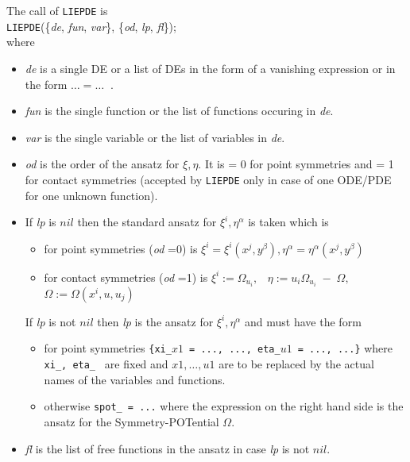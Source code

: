 The call of {\tt LIEPDE} is \\
{\tt LIEPDE}(\{{\it  de}, {\it  fun}, {\it  var}\},
\{{\it  od}, {\it  lp}, {\it  fl}\}); \\
where
\begin{itemize}
\item {\it de} is a single DE or a list of DEs in the form of a vanishing
      expression or in the form $\ldots=\ldots\;\;$.
\item {\it fun} is the single function or the list of functions occuring
      in {\it de}.
\item {\it var} is the single variable or the list of variables in {\it de}.
\item {\it od} is the order of the ansatz for $\xi, \eta.$ It is = 0 for
point symmetries and = 1 for contact symmetries (accepted by
{\tt LIEPDE} only in case of one ODE/PDE for one unknown function).
\item If {\it lp} is $nil$ then the standard ansatz for $\xi^i, \eta^\alpha$
is taken which is
  \begin{itemize}
  \item for point symmetries ({\it od} =0) is $\xi^i = \xi^i(x^j,y^\beta),
      \eta^\alpha = \eta^\alpha(x^j,y^\beta)$
  \item for contact symmetries ({\it od} =1) is
   $ \xi^i := \Omega_{u_i}, \;\;\;
     \eta := u_i\Omega_{u_i} \; - \; \Omega, $ \\
     $\Omega:=\Omega(x^i, u, u_j)$
  \end{itemize}

  If {\it lp} is not $nil$ then {\it lp} is the ansatz for
  $\xi^i, \eta^\alpha$ and must have the form
  \begin{itemize}
    \item for point symmetries
        {\tt \{xi\_\mbox{$x1$} = ..., ..., eta\_\mbox{$u1$} = ..., ...\}}
        where {\tt xi\_, eta\_ }
        are fixed and $x1, \ldots, u1$ are to be replaced by the actual names
        of the variables and functions.
    \item otherwise {\tt spot\_ = ...} where the expression on the right hand
        side is the ansatz for the Symmetry-POTential $\Omega.$
  \end{itemize}

\item {\it fl} is the list of free functions in the ansatz
in case {\it lp} is not $nil.$
\end{itemize}


